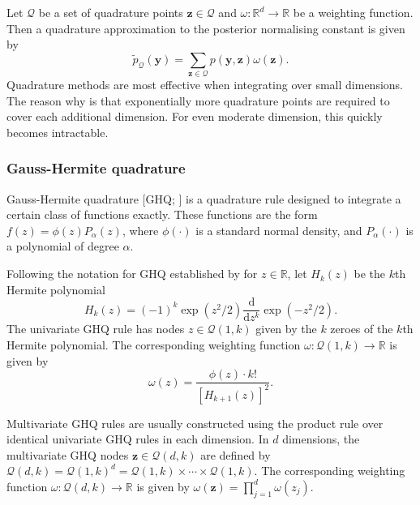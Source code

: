 \documentclass[a4paper, nobind]{templates/ociamthesis}
\newcommand{\y}{\mathbf{y}}
\newcommand{\z}{\mathbf{z}}
\begin{document}
Let \(\mathcal{Q}\) be a set of quadrature points \(\z \in \mathcal{Q}\) and \(\omega: \mathbb{R}^d \to \mathbb{R}\) be a weighting function.
Then a quadrature approximation to the posterior normalising constant is given by
\begin{equation}
\tilde p_{\mathcal{Q}}(\y) = \sum_{\z \in \mathcal{Q}} p(\y, \z) \omega(\z).
\end{equation}
Quadrature methods are most effective when integrating over small dimensions.
The reason why is that exponentially more quadrature points are required to cover each additional dimension.
For even moderate dimension, this quickly becomes intractable.

\hypertarget{gauss-hermite-quadrature}{%
\subsubsection{Gauss-Hermite quadrature}\label{gauss-hermite-quadrature}}

Gauss-Hermite quadrature {[}GHQ; \textcite{davis1975methods}{]} is a quadrature rule designed to integrate a certain class of functions exactly.
These functions are the form \(f(z) = \phi(z) P_\alpha(z)\), where \(\phi(\cdot)\) is a standard normal density, and \(P_\alpha(\cdot)\) is a polynomial of degree \(\alpha\).

Following the notation for GHQ established by \textcite{bilodeau2022stochastic} for \(z \in \mathbb{R}\), let \(H_k(z)\) be the \(k\)th Hermite polynomial
\begin{equation}
H_k(z) = (-1)^k \exp(z^2 / 2) \frac{\text{d}}{\text{d}z^k} \exp(-z^2 / 2).
\end{equation}
The univariate GHQ rule has nodes \(z \in \mathcal{Q}(1, k)\) given by the \(k\) zeroes of the \(k\)th Hermite polynomial.
The corresponding weighting function \(\omega: \mathcal{Q}(1, k) \to \mathbb{R}\) is given by
\begin{equation}
\omega(z) = \frac{\phi(z) \cdot k!}{[H_{k + 1}(z)]^2}.
\end{equation}

Multivariate GHQ rules are usually constructed using the product rule over identical univariate GHQ rules in each dimension.
In \(d\) dimensions, the multivariate GHQ nodes \(\z \in \mathcal{Q}(d, k)\) are defined by \(\mathcal{Q}(d, k) = \mathcal{Q}(1, k)^d = \mathcal{Q}(1, k) \times \cdots \times \mathcal{Q}(1, k)\).
The corresponding weighting function \(\omega: \mathcal{Q}(d, k) \to \mathbb{R}\) is given by \(\omega(\z) = \prod_{j = 1}^d \omega(z_j)\).
\end{document}
